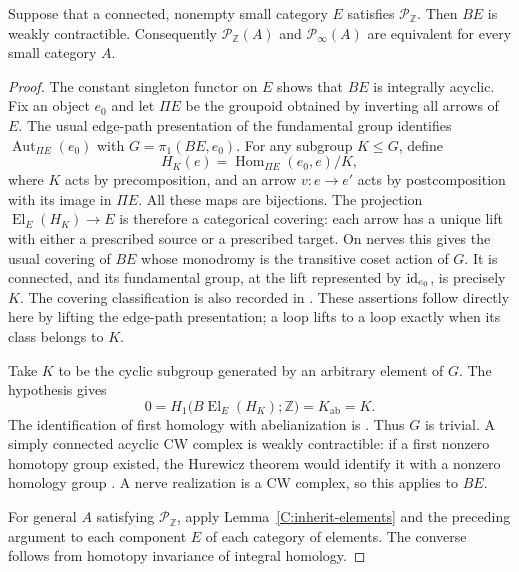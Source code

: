 \begin{lemma}\label{C:cyclic-covers}
Suppose that a connected, nonempty small category $E$ satisfies $\mathcal P_{\mathbb Z}$. Then $BE$ is weakly contractible. Consequently $\mathcal P_{\mathbb Z}(A)$ and $\mathcal P_\infty(A)$ are equivalent for every small category $A$.
\end{lemma}
\begin{proof}
The constant singleton functor on $E$ shows that $BE$ is integrally acyclic. Fix an object $e_0$ and let $\Pi E$ be the groupoid obtained by inverting all arrows of $E$. The usual edge-path presentation of the fundamental group identifies $\operatorname{Aut}_{\Pi E}(e_0)$ with $G=\pi_1(BE,e_0)$. For any subgroup $K\leq G$, define
\[
 H_K(e)=\operatorname{Hom}_{\Pi E}(e_0,e)/K,
\]
where $K$ acts by precomposition, and an arrow $v:e\to e'$ acts by postcomposition with its image in $\Pi E$. All these maps are bijections. The projection $\operatorname{El}_E(H_K)\to E$ is therefore a categorical covering: each arrow has a unique lift with either a prescribed source or a prescribed target. On nerves this gives the usual covering of $BE$ whose monodromy is the transitive coset action of $G$. It is connected, and its fundamental group, at the lift represented by $\mathrm{id}_{e_0}$, is precisely $K$. The covering classification is also recorded in \citet[Theorem~1.38]{Hatcher2002}. These assertions follow directly here by lifting the edge-path presentation; a loop lifts to a loop exactly when its class belongs to $K$.

Take $K$ to be the cyclic subgroup generated by an arbitrary element of $G$. The hypothesis gives
\[
 0=H_1\bigl(B\operatorname{El}_E(H_K);\mathbb Z\bigr)
   =K_{\mathrm{ab}}=K.
\]
The identification of first homology with abelianization is \citet[Theorem~2A.1]{Hatcher2002}. Thus $G$ is trivial. A simply connected acyclic CW complex is weakly contractible: if a first nonzero homotopy group existed, the Hurewicz theorem would identify it with a nonzero homology group \citep[Theorem~4.32]{Hatcher2002}. A nerve realization is a CW complex, so this applies to $BE$.

For general $A$ satisfying $\mathcal P_{\mathbb Z}$, apply Lemma~\ref{C:inherit-elements} and the preceding argument to each component $E$ of each category of elements. The converse follows from homotopy invariance of integral homology.
\end{proof}

